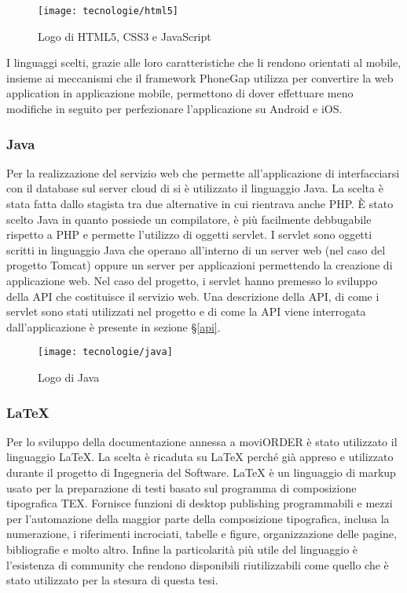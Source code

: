 \begin{figure}[!h] 
    \centering 
    	\texttt{[image: tecnologie/html5]}
    \caption{Logo di HTML5, CSS3 e JavaScript}
\end{figure}

I linguaggi scelti, grazie alle loro caratteristiche che li rendono orientati al mobile, insieme ai meccanismi che il framework PhoneGap utilizza per convertire la web application in applicazione mobile, permettono di dover effettuare meno modifiche in seguito per perfezionare l'applicazione su Android e iOS.

\subsubsection{Java}

Per la realizzazione del servizio web che permette all'applicazione di interfacciarsi con il database sul server cloud di \visione{} si è utilizzato il linguaggio Java. La scelta è stata fatta dallo stagista tra due alternative in cui rientrava anche PHP. È stato scelto Java in quanto possiede un compilatore, è più facilmente debbugabile rispetto a PHP e permette l'utilizzo di oggetti servlet.  I servlet sono oggetti scritti in linguaggio Java che operano all'interno di un server web (nel caso del progetto Tomcat) oppure un server per applicazioni permettendo la creazione di applicazione web. Nel caso del progetto, i servlet hanno premesso lo sviluppo della API che costituisce il servizio web. Una descrizione della API, di come i servlet sono stati utilizzati nel progetto e di come la API viene interrogata dall'applicazione è presente in sezione §\ref{api}.

\begin{figure}[!h] 
    \centering 
    \texttt{[image: tecnologie/java]} 
    \caption{Logo di Java}
\end{figure}

\subsubsection{\LaTeX{}}

Per lo sviluppo della documentazione annessa a moviORDER è stato utilizzato il linguaggio \LaTeX{}. La scelta è ricaduta su \LaTeX{} perché già appreso e utilizzato durante il progetto di Ingegneria del Software. \LaTeX{} è un linguaggio di markup usato per la preparazione di testi basato sul programma di composizione tipografica TEX. Fornisce funzioni di desktop publishing programmabili e mezzi per l'automazione della maggior parte della composizione tipografica, inclusa la numerazione, i riferimenti incrociati, tabelle e figure, organizzazione delle pagine, bibliografie e molto altro. Infine la particolarità più utile del linguaggio è l'esistenza di community che rendono disponibili  riutilizzabili come quello che è stato utilizzato per la stesura di questa tesi.

